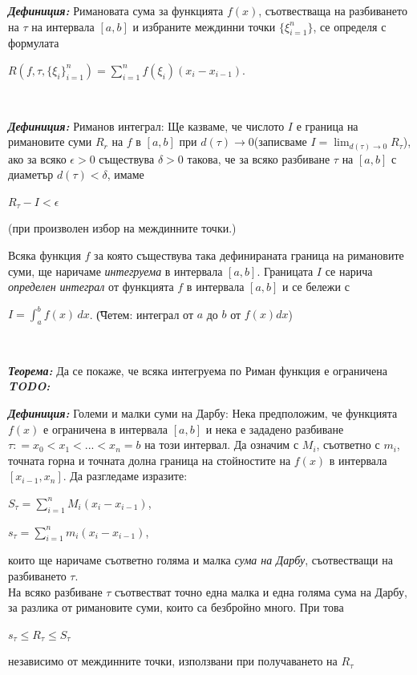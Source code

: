 \documentclass[11pt]{article} %
\newcommand{\italicBold}[1]{\textbf{\emph{#1}}}
\newcommand{\definition}{\italicBold{Дефиниция: }}
\newcommand{\theorem}{\italicBold{Теорема: }}
\newcommand{\integral}[4]{\displaystyle \int_{#1}^{#2}#3\,#4}
\newcommand{\curlies}[1]{\{#1\}}
\begin{document}
\definition Римановата сума за функцията $f(x)$, съотвестваща на разбиването на $\tau$ на интервала $[a,b]$ и избраните междинни точки $\curlies{\xi^{n}_{i=1}}$, се определя с формулата\\
\centerline{$R(f,\tau,\curlies{\xi_{i}}^{n}_{i=1})=\displaystyle\sum_{i=1}^{n}f(\xi_{i})(x_{i}-x_{i-1})$.}\\\par

\definition Риманов интеграл: Ще казваме, че числото $I$ е граница на римановите суми $R_{r}$ на $f$ в $[a,b]$ при $d(\tau) \to 0$(записваме $I = \lim_{d(\tau)\to 0}R_{\tau}$), ако за всяко $\epsilon > 0$ съществува $\delta > 0$ такова, че за всяко разбиване $\tau$ на $[a,b]$ с диаметър $d(\tau)<\delta$, имаме \\
\centerline{$R_{\tau}-I < \epsilon$}
(при произволен избор на междинните точки.)\par
Всяка функция $f$ за която съществува така дефинираната граница на римановите суми, ще наричаме \textit{интегруема} в интервала $[a,b]$. Границата $I$ се нарича \textit{определен интеграл} от функцията $f$ в интервала $[a,b]$ и се бележи с \\
\centerline{$I = \integral{a}{b}{f(x)}{dx}$. \t (Четем: интеграл от $a$ до $b$ от $f(x)dx$)}\\\par

\theorem Да се покаже, че всяка интегруема по Риман функция е ограничена \italicBold{TODO: } \\\par

\definition Големи и малки суми на Дарбу: Нека предположим, че функцията $f(x)$ е ограничена в интервала $[a,b]$ и нека е зададено разбиване $\tau: = x_{0}<x_{1}<...<x_{n}=b$ на този интервал. Да означим с $M_{i}$, съответно с $m_{i}$, точната горна и точната долна граница на стойностите на $f(x)$ в интервала $[x_{i-1},x_{n}]$. Да разгледаме изразите:\\
\centerline{$S_{\tau} = \displaystyle \sum_{i=1}^{n}M_{i}(x_{i}-x_{i-1})$,}
\centerline{$s_{\tau} = \displaystyle \sum_{i=1}^{n}m_{i}(x_{i}-x_{i-1})$,}
които ще наричаме съответно голяма и малка \textit{сума на Дарбу}, съотвестващи на разбиването $\tau$.\\
На всяко разбиване $\tau$ съотвестват точно една малка и една голяма сума на Дарбу, за разлика от римановите суми, които са безбройно много. При това \\
\centerline{$s_{\tau}\leq R_{\tau}\leq S_{\tau}$}
независимо от междинните точки, използвани при получаването на $R_{\tau}$\\\par
\end{document}

